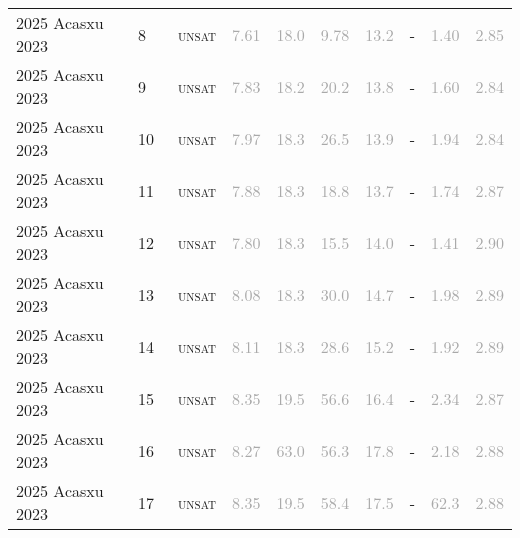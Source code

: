 \begin{center}
{\begin{longtable}{@{}llllllllll@{}}
2025 Acasxu 2023 & 8 & ~\textsc{unsat} & \textcolor{darkgray}{7.61} & \textcolor{darkgray}{18.0} & \textcolor{darkgray}{9.78} & \textcolor{darkgray}{13.2} & - & \textcolor{darkgray}{1.40} & \textcolor{darkgray}{2.85} \\
2025 Acasxu 2023 & 9 & ~\textsc{unsat} & \textcolor{darkgray}{7.83} & \textcolor{darkgray}{18.2} & \textcolor{darkgray}{20.2} & \textcolor{darkgray}{13.8} & - & \textcolor{darkgray}{1.60} & \textcolor{darkgray}{2.84} \\
2025 Acasxu 2023 & 10 & ~\textsc{unsat} & \textcolor{darkgray}{7.97} & \textcolor{darkgray}{18.3} & \textcolor{darkgray}{26.5} & \textcolor{darkgray}{13.9} & - & \textcolor{darkgray}{1.94} & \textcolor{darkgray}{2.84} \\
2025 Acasxu 2023 & 11 & ~\textsc{unsat} & \textcolor{darkgray}{7.88} & \textcolor{darkgray}{18.3} & \textcolor{darkgray}{18.8} & \textcolor{darkgray}{13.7} & - & \textcolor{darkgray}{1.74} & \textcolor{darkgray}{2.87} \\
2025 Acasxu 2023 & 12 & ~\textsc{unsat} & \textcolor{darkgray}{7.80} & \textcolor{darkgray}{18.3} & \textcolor{darkgray}{15.5} & \textcolor{darkgray}{14.0} & - & \textcolor{darkgray}{1.41} & \textcolor{darkgray}{2.90} \\
2025 Acasxu 2023 & 13 & ~\textsc{unsat} & \textcolor{darkgray}{8.08} & \textcolor{darkgray}{18.3} & \textcolor{darkgray}{30.0} & \textcolor{darkgray}{14.7} & - & \textcolor{darkgray}{1.98} & \textcolor{darkgray}{2.89} \\
2025 Acasxu 2023 & 14 & ~\textsc{unsat} & \textcolor{darkgray}{8.11} & \textcolor{darkgray}{18.3} & \textcolor{darkgray}{28.6} & \textcolor{darkgray}{15.2} & - & \textcolor{darkgray}{1.92} & \textcolor{darkgray}{2.89} \\
2025 Acasxu 2023 & 15 & ~\textsc{unsat} & \textcolor{darkgray}{8.35} & \textcolor{darkgray}{19.5} & \textcolor{darkgray}{56.6} & \textcolor{darkgray}{16.4} & - & \textcolor{darkgray}{2.34} & \textcolor{darkgray}{2.87} \\
2025 Acasxu 2023 & 16 & ~\textsc{unsat} & \textcolor{darkgray}{8.27} & \textcolor{darkgray}{63.0} & \textcolor{darkgray}{56.3} & \textcolor{darkgray}{17.8} & - & \textcolor{darkgray}{2.18} & \textcolor{darkgray}{2.88} \\
2025 Acasxu 2023 & 17 & ~\textsc{unsat} & \textcolor{darkgray}{8.35} & \textcolor{darkgray}{19.5} & \textcolor{darkgray}{58.4} & \textcolor{darkgray}{17.5} & - & \textcolor{darkgray}{62.3} & \textcolor{darkgray}{2.88} \\

\end{longtable}}
\end{center}
